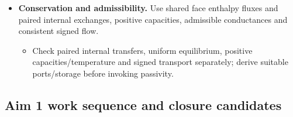 \begin{itemize}[leftmargin=*]
\begin{itemize}
\end{itemize}
\item {}\textbf{Conservation and admissibility.} Use shared face enthalpy fluxes and paired internal exchanges, positive capacities, admissible conductances and consistent signed flow.
\begin{itemize}
\item Check paired internal transfers, uniform equilibrium, positive capacities/\allowbreak{}temperature and signed transport separately; derive suitable ports/\allowbreak{}storage before invoking passivity.
\end{itemize}
\end{itemize}

\subsection{Aim 1 work sequence and closure candidates}\label{subsec:aim-one-work-sequence}
